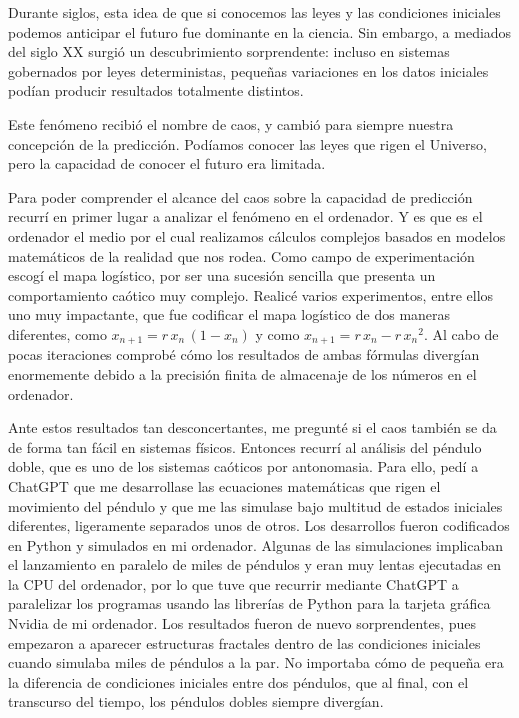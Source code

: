 \documentclass[
  10pt,
  a4paper,
  DIV=11,
  numbers=noendperiod,
  open=any]{scrreprt}
\numberwithin{equation}{chapter}
\numberwithin{equation}{section}
\renewcommand{\[}{\begin{equation}}
\renewcommand{\]}{\end{equation}}
\begin{document}
Durante siglos, esta idea de que si conocemos las leyes y las
condiciones iniciales podemos anticipar el futuro fue dominante en la
ciencia. Sin embargo, a mediados del siglo XX surgió un descubrimiento
sorprendente: incluso en sistemas gobernados por leyes deterministas,
pequeñas variaciones en los datos iniciales podían producir resultados
totalmente distintos.

Este fenómeno recibió el nombre de caos, y cambió para siempre nuestra
concepción de la predicción. Podíamos conocer las leyes que rigen el
Universo, pero la capacidad de conocer el futuro era limitada.

Para poder comprender el alcance del caos sobre la capacidad de
predicción recurrí en primer lugar a analizar el fenómeno en el
ordenador. Y es que es el ordenador el medio por el cual realizamos
cálculos complejos basados en modelos matemáticos de la realidad que nos
rodea. Como campo de experimentación escogí el mapa logístico, por ser
una sucesión sencilla que presenta un comportamiento caótico muy
complejo. Realicé varios experimentos, entre ellos uno muy impactante,
que fue codificar el mapa logístico de dos maneras diferentes, como
\(x_{n+1} = r\,x_n\,(1 - x_n)\) y como
\(x_{n+1} = r\,x_n - r\,{x_n}^2\). Al cabo de pocas iteraciones comprobé
cómo los resultados de ambas fórmulas divergían enormemente debido a la
precisión finita de almacenaje de los números en el ordenador.

Ante estos resultados tan desconcertantes, me pregunté si el caos
también se da de forma tan fácil en sistemas físicos. Entonces recurrí
al análisis del péndulo doble, que es uno de los sistemas caóticos por
antonomasia. Para ello, pedí a ChatGPT que me desarrollase las
ecuaciones matemáticas que rigen el movimiento del péndulo y que me las
simulase bajo multitud de estados iniciales diferentes, ligeramente
separados unos de otros. Los desarrollos fueron codificados en Python y
simulados en mi ordenador. Algunas de las simulaciones implicaban el
lanzamiento en paralelo de miles de péndulos y eran muy lentas
ejecutadas en la CPU del ordenador, por lo que tuve que recurrir
mediante ChatGPT a paralelizar los programas usando las librerías de
Python para la tarjeta gráfica Nvidia de mi ordenador. Los resultados
fueron de nuevo sorprendentes, pues empezaron a aparecer estructuras
fractales dentro de las condiciones iniciales cuando simulaba miles de
péndulos a la par. No importaba cómo de pequeña era la diferencia de
condiciones iniciales entre dos péndulos, que al final, con el
transcurso del tiempo, los péndulos dobles siempre divergían.
\end{document}

